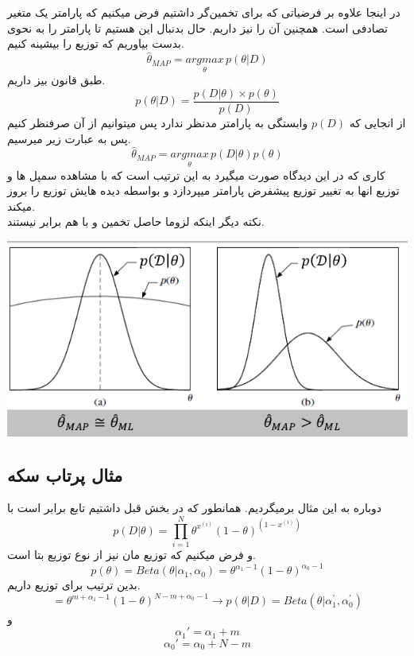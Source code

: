 \documentclass[12pt]{article}
\begin{document}
\section*{}
در اینجا علاوه بر فرضیاتی که برای تخمین‌گر 
داشتیم فرض میکنیم که پارامتر یک متغیر تصادفی است. همچنین 
آن را نیز داریم.
حال بدنبال این هستیم تا پارامتر را به نحوی بدست بیاوریم که توزیع 
را بیشینه کنیم.
\[\hat{\theta}_{MAP} = \underset{\theta}{argmax}\, p(\theta | D)\]
طبق قانون بیز داریم.
\[p(\theta|D) = \frac{p(D|\theta) \times p(\theta)}{p(D)}\]
از انجایی که 
$p(D)$
وابستگی به پارامتر مدنظر ندارد پس میتوانیم از آن صرفنظر کنیم پس به عبارت زیر میرسیم.
\[\hat{\theta}_{MAP} = \underset{\theta}{argmax}\,p(D|\theta)p(\theta)\]
کاری که در این دیدگاه صورت میگیرد به این ترتیب است که با مشاهده سمپل ها و توزیع انها به تغییر توزیع پیشفرض پارامتر میپردازد و بواسطه دیده هایش توزیع را بروز میکند.
\\
نکته دیگر اینکه لزوما حاصل تخمین 
و 
با هم برابر نیستند.

\includegraphics[width=\textwidth]{figs/MLEvsMAP.png}

\subsection*{مثال پرتاب سکه}
دوباره به این مثال برمیگردیم. همانطور که در بخش قبل داشتیم تابع 
برابر است با 
\[p(D|\theta) = \prod_{i=1}^{N} \theta^{x^{(i)}} (1 - \theta)^{(1 - x^{(i)})}\]
و فرض میکنیم که توزیع 
مان نیز از نوع توزیع بتا است.
\[p(\theta) = Beta(\theta|\alpha_1, \alpha_0) = \theta^{\alpha_1 - 1}(1 - \theta)^{\alpha_0 -1}\]
بدین ترتیب برای توزیع 
داریم.
\[= \theta^{m + \alpha_1 - 1}(1 - \theta)^{N - m + \alpha_0 - 1} \xrightarrow[]{} p(\theta|D) = Beta(\theta|\alpha_1^{'}, \alpha_0^{'})\]
و 
\[
\alpha_1' = \alpha_1 + m\]
\[\alpha_0' = \alpha_0 + N - m
\]
\end{document}
